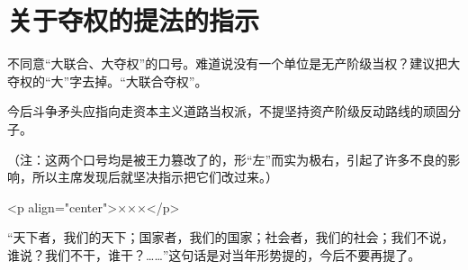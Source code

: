 \section[关于夺权的提法的指示（一九六七年二月二十七日）]{关于夺权的提法的指示}


不同意“大联合、大夺权”的口号。难道说没有一个单位是无产阶级当权？建议把大夺权的“大”字去掉。“大联合夺权”。

今后斗争矛头应指向走资本主义道路当权派，不提坚持资产阶级反动路线的顽固分子。

（注：这两个口号均是被王力篡改了的，形“左”而实为极右，引起了许多不良的影响，所以主席发现后就坚决指示把它们改过来。）

<p align="center">×××</p>

“天下者，我们的天下；国家者，我们的国家；社会者，我们的社会；我们不说，谁说？我们不干，谁干？……”这句话是对当年形势提的，今后不要再提了。


